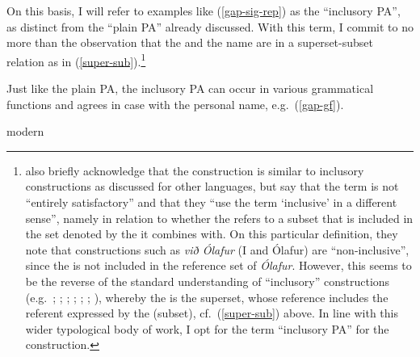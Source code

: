 \documentclass[output=paper,colorlinks,citecolor=brown]{langscibook}
\begin{document}
On this basis, I will refer to examples like (\ref{gap-sig-rep}) as the ``inclusory PA'', as distinct from the ``plain PA'' already discussed. With this term, I commit to no more than the observation that the  and the name are in a superset-subset relation as in (\ref{super-sub}).\footnote{\citet[2]{sigurdhsson2020we} also briefly acknowledge that the construction is similar to inclusory constructions as discussed for other languages, but say that the term is not ``entirely satisfactory'' and that they ``use the term `inclusive' in a different sense'', namely in relation to whether the  refers to a subset that is included in the set denoted by the  it combines with. On this particular definition, they note that constructions such as \textit{við Ólafur} (I and Ólafur) are ``non-inclusive'', since the  is not included in the reference set of \textit{Ólafur}. However, this seems to be the reverse of the standard understanding of ``inclusory'' constructions (e.g.~\citealp{lichtenberk2000inclusory}; \citealp{bhat2004conjunction}; \citealp{gaby2005some}; \citealp{haspelmath2007coordination}; \citealp{gil2009associative}; \citealp{bril2011noun}; \citealp{schultze2013kriol}), whereby the  is the superset, whose reference includes the referent expressed by the  (subset), cf.~(\ref{super-sub}) above. In line with this wider typological body of work, I opt for the term ``inclusory PA'' for the  construction.}

Just like the plain PA, the inclusory PA can occur in various grammatical functions and agrees in case with the personal name, e.g.~(\ref{gap-gf}).


\ea \label{gap-gf} modern 
\z 
\z
\end{document}
